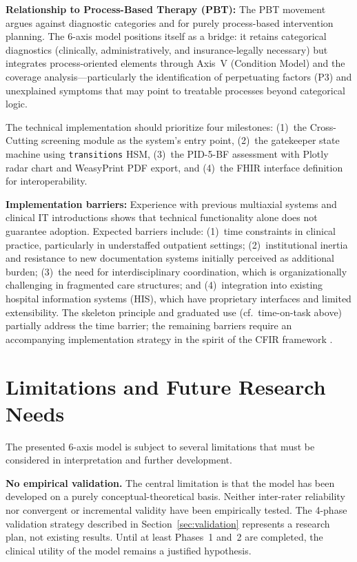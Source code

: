 \documentclass[11pt,a4paper]{article}
\begin{document}
\textbf{Relationship to Process-Based Therapy (PBT):} The PBT movement argues against diagnostic categories and for purely process-based intervention planning. The 6-axis model positions itself as a bridge: it retains categorical diagnostics (clinically, administratively, and insurance-legally necessary) but integrates process-oriented elements through Axis~V (Condition Model) and the coverage analysis---particularly the identification of perpetuating factors (P3) and unexplained symptoms that may point to treatable processes beyond categorical logic.

The technical implementation should prioritize four milestones: (1)~the Cross-Cutting screening module as the system's entry point, (2)~the gatekeeper state machine using \texttt{transitions} HSM, (3)~the PID-5-BF assessment with Plotly radar chart and WeasyPrint PDF export, and (4)~the FHIR interface definition for interoperability.

\textbf{Implementation barriers:} Experience with previous multiaxial systems and clinical IT introductions shows that technical functionality alone does not guarantee adoption. Expected barriers include: (1)~time constraints in clinical practice, particularly in understaffed outpatient settings; (2)~institutional inertia and resistance to new documentation systems initially perceived as additional burden; (3)~the need for interdisciplinary coordination, which is organizationally challenging in fragmented care structures; and (4)~integration into existing hospital information systems (HIS), which have proprietary interfaces and limited extensibility. The skeleton principle and graduated use (cf.\ time-on-task above) partially address the time barrier; the remaining barriers require an accompanying implementation strategy in the spirit of the CFIR framework \citep{Damschroder2009}.

\section{Limitations and Future Research Needs}
\label{sec:limitations}

The presented 6-axis model is subject to several limitations that must be considered in interpretation and further development.

\textbf{No empirical validation.} The central limitation is that the model has been developed on a purely conceptual-theoretical basis. Neither inter-rater reliability nor convergent or incremental validity have been empirically tested. The 4-phase validation strategy described in Section~\ref{sec:validation} represents a research plan, not existing results. Until at least Phases~1 and~2 are completed, the clinical utility of the model remains a justified hypothesis.
\end{document}
